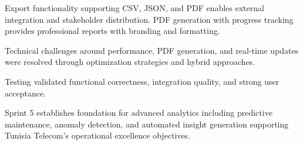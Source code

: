 Export functionality supporting CSV, JSON, and PDF enables external integration and stakeholder distribution. PDF generation with progress tracking provides professional reports with branding and formatting.

Technical challenges around performance, PDF generation, and real-time updates were resolved through optimization strategies and hybrid approaches.

Testing validated functional correctness, integration quality, and strong user acceptance.

Sprint 5 establishes foundation for advanced analytics including predictive maintenance, anomaly detection, and automated insight generation supporting Tunisia Telecom's operational excellence objectives.